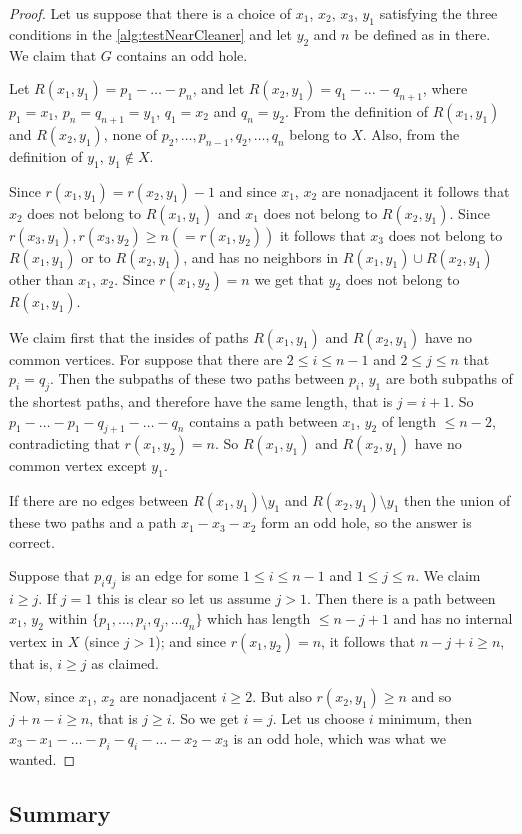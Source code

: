 \begin{proof}
	Let us suppose that there is a choice of $x_1$, $x_2$, $x_3$, $y_1$ satisfying the three conditions in the \cref{alg:testNearCleaner} and let $y_2$ and $n$ be defined as in there. We claim that $G$ contains an odd hole.

	Let $R(x_1, y_1) = p_1-\ldots -p_n$, and let $R(x_2, y_1) = q_1-\ldots -q_{n+1}$, where $p_1 = x_1$, $p_n = q_{n+1} = y_1$, $q_1 = x_2$ and $q_n = y_2$. From the definition of $R(x_1, y_1)$ and $R(x_2, y_1)$, none of $p_2, \ldots, p_{n-1}, q_2, \ldots, q_n$ belong to $X$. Also, from the definition of $y_1$, $y_1 \notin X$.

	Since $r(x_1, y_1) = r(x_2, y_1) - 1$ and since $x_1$, $x_2$ are nonadjacent it follows that $x_2$ does not belong to $R(x_1, y_1)$ and $x_1$ does not belong to $R(x_2, y_1)$. Since $r(x_3, y_1), r(x_3, y_2) \geq n (= r(x_1, y_2))$ it follows that $x_3$ does not belong to $R(x_1, y_1)$ or to $R(x_2, y_1)$, and has no neighbors in $R(x_1, y_1) \cup R(x_2, y_1)$ other than $x_1$, $x_2$. Since $r(x_1, y_2) = n$ we get that $y_2$ does not belong to $R(x_1, y_1)$.

	We claim first that the insides of paths $R(x_1, y_1)$ and $R(x_2, y_1)$ have no common vertices. For suppose that there are $2 \leq i \leq n-1$ and $2 \leq j \leq n$ that $p_i = q_j$. Then the subpaths of these two paths between $p_i$, $y_1$ are both subpaths of the shortest paths, and therefore have the same length, that is $j=i+1$. So $p_1-\ldots-p_1-q_{j+1}-\ldots-q_n$ contains a path between $x_1$, $y_2$ of length $\leq n-2$, contradicting that $r(x_1, y_2) = n$. So $R(x_1, y_1)$ and $R(x_2, y_1)$ have no common vertex except $y_1$.

	If there are no edges between $R(x_1, y_1) \setminus y_1$ and $R(x_2, y_1) \setminus y_1$ then the union of these two paths and a path $x_1-x_3-x_2$ form an odd hole, so the answer is correct.

	Suppose that $p_iq_j$ is an edge for some $1\leq i \leq n-1$ and $1 \leq j \leq n$. We claim $i \geq j$. If $j = 1$ this is clear so let us assume $j > 1$. Then there is a path between $x_1$, $y_2$ within $\{p_1, \ldots , p_i, q_j, \ldots q_n\}$ which has length $\leq n-j+1$ and has no internal vertex in $X$ (since $j > 1$); and since $r(x_1, y_2) = n$, it follows that $n-j+i \geq n$, that is, $i \geq j$ as claimed.

	Now, since $x_1$, $x_2$ are nonadjacent $i \geq 2$. But also $r(x_2, y_1) \geq n$ and so $j+n-i \geq n$, that is $j \geq i$. So we get $i=j$. Let us choose $i$ minimum, then $x_3-x_1-\ldots-p_i-q_i-\ldots-x_2-x_3$ is an odd hole, which was what we wanted.
\end{proof}

\subsection{Summary}

